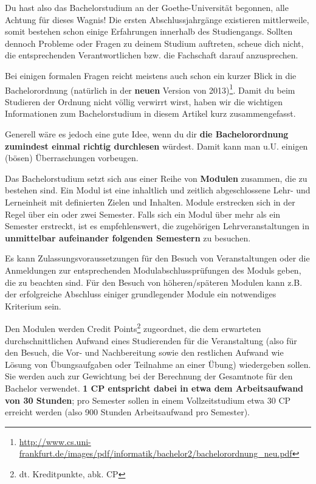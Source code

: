 Du hast also das Bachelorstudium an der Goethe-Universität begonnen, alle
Achtung für dieses Wagnis! Die ersten Abschlussjahrgänge existieren
mittlerweile, somit bestehen schon einige Erfahrungen innerhalb des
Studiengangs. Sollten dennoch Probleme oder Fragen zu deinem Studium auftreten,
scheue dich nicht, die entsprechenden Verantwortlichen bzw. die Fachschaft
darauf anzusprechen.

Bei einigen formalen Fragen reicht meistens auch schon ein
kurzer Blick in die Bachelorordnung (natürlich in der \textbf{neuen} Version
von 2013)\footnote{\href{http://www.cs.uni-frankfurt.de/images/pdf/informatik/bachelor2/bachelorordnung\_neu.pdf}{http://www.cs.uni-frankfurt.de/images/pdf/informatik/bachelor2/bachelorordnung\_neu.pdf}}.
Damit du beim Studieren der Ordnung nicht völlig verwirrt wirst, haben wir die
wichtigen Informationen zum Bachelorstudium in diesem Artikel kurz zusammengefasst.

Generell wäre es jedoch eine gute Idee, wenn du dir \textbf{die Bachelorordnung zumindest einmal richtig durchlesen} würdest. Damit kann man u.U. einigen (bösen) Überraschungen vorbeugen.

Das Bachelorstudium setzt sich aus einer Reihe von \textbf{Modulen} zusammen, die zu bestehen sind. Ein Modul ist eine inhaltlich und zeitlich abgeschlossene Lehr- und Lerneinheit mit definierten Zielen und Inhalten. Module erstrecken sich in der Regel über ein oder zwei Semester. Falls sich ein Modul über mehr als ein Semester erstreckt, ist es empfehlenswert, die zugehörigen Lehrveranstaltungen in \textbf{unmittelbar aufeinander folgenden Semestern} zu besuchen.

Es kann Zulassungsvoraussetzungen für den Besuch von Veranstaltungen oder die Anmeldungen zur entsprechenden Modulabschlussprüfungen des Moduls geben, die zu beachten sind. Für den Besuch von höheren/späteren Modulen kann z.B. der erfolgreiche Abschluss einiger grundlegender Module ein notwendiges Kriterium sein.

Den Modulen werden Credit Points\footnote{dt. Kreditpunkte, abk. CP} zugeordnet, die dem erwarteten durchschnittlichen Aufwand eines Studierenden für die Veranstaltung (also für den Besuch, die Vor- und Nachbereitung sowie den restlichen Aufwand wie Lösung von Übungsaufgaben oder Teilnahme an einer Übung) wiedergeben sollen. Sie werden auch zur Gewichtung bei der Berechnung der Gesamtnote für den Bachelor verwendet. \textbf{1 CP entspricht dabei in etwa dem Arbeitsaufwand von 30 Stunden}; pro Semester sollen in einem Vollzeitstudium etwa 30 CP erreicht werden (also 900 Stunden Arbeitsaufwand pro Semester).

